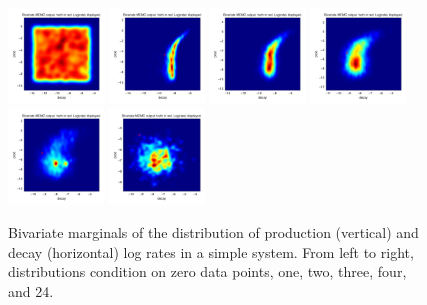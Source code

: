\documentclass{article}
\begin{document}
\begin{figure}[h!]
\begin{center}
\includegraphics[height=1in,width=1in]{simple_million_stagewise_plots/dist0_contour_decay_prod.png}
\includegraphics[height=1in,width=1in]{simple_million_stagewise_plots/dist1_contour_decay_prod.png}
\includegraphics[height=1in,width=1in]{simple_million_stagewise_plots/dist2_contour_decay_prod.png}
\includegraphics[height=1in,width=1in]{simple_million_stagewise_plots/dist3_contour_decay_prod.png}
\includegraphics[height=1in,width=1in]{simple_million_stagewise_plots/dist4_contour_decay_prod.png}
\includegraphics[height=1in,width=1in]{simple_million_stagewise_plots/dist23_contour_decay_prod.png}
\caption{Bivariate marginals of the distribution of production (vertical) and decay (horizontal) log rates in a simple system. From left to right, distributions condition on zero data points, one, two, three, four, and 24. \label{fig:simple_test}}
\end{center}

\end{figure}
\end{document}
